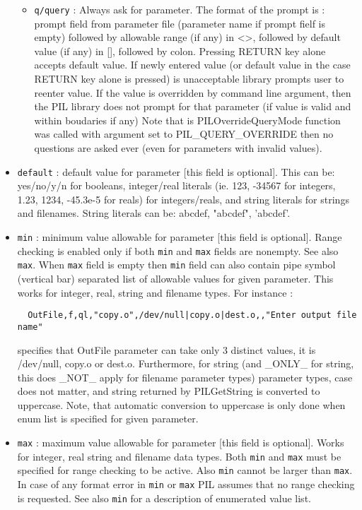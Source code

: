 \begin{itemize}
\begin{itemize}
\item
{\tt q/query} : Always ask for parameter. The format of the prompt is :
prompt field from parameter file (parameter name if prompt fielf
is empty) followed by allowable range (if any) in <>, followed
by default value (if any) in [], followed by colon. Pressing RETURN
key alone accepts default value. If newly entered value (or default
value in the case RETURN key alone is pressed) is unacceptable library
prompts user to reenter value. If the value is overridden by command
line argument, then the PIL library does not prompt for that parameter
(if value is valid and within boudaries if any) 
Note that is PILOverrideQueryMode function
was called with argument set to PIL\_QUERY\_OVERRIDE then no questions
are asked ever (even for parameters with invalid values).

\end{itemize}

\item
{\tt default} : default value for parameter [this field is optional]. This can be:
yes/no/y/n for booleans, integer/real literals (ie. 123, -34567 for integers, 1.23,
1234, -45.3e-5 for reals) for integers/reals, and string literals for
strings and filenames. String literals can be: abcdef, "abcdef", 'abcdef'. 

\item
{\tt min} : minimum value allowable for parameter [this field is optional].
Range checking is enabled only if both {\tt min} and {\tt max} fields
are nonempty. See also {\tt max}.
When {\tt max} field is empty then {\tt min} field can also contain pipe
symbol (vertical bar)
separated list of allowable values for given parameter. This works for
integer, real, string and filename types. For instance :

\begin{verbatim}
  OutFile,f,ql,"copy.o",/dev/null|copy.o|dest.o,,"Enter output file name"
\end{verbatim}

specifies that OutFile parameter can take only 3 distinct values, it is
/dev/null, copy.o or dest.o. Furthermore, for string (and \_ONLY\_ for string,
this does \_NOT\_ apply for filename parameter types) parameter types,
case does not matter, and string returned by PILGetString is converted
to uppercase. Note, that automatic conversion to uppercase is only done when
enum list is specified for given parameter.

\item
{\tt max} : maximum value allowable for parameter [this field is optional].
Works for integer, real string and filename data types. Both {\tt min} and 
{\tt max} must be specified for range checking to be active. Also {\tt min}
cannot be larger than {\tt max}. In case of any format error in {\tt min} or
{\tt max} PIL assumes that no range checking is requested. See also 
{\tt min} for a description of enumerated value list.


\end{itemize}
